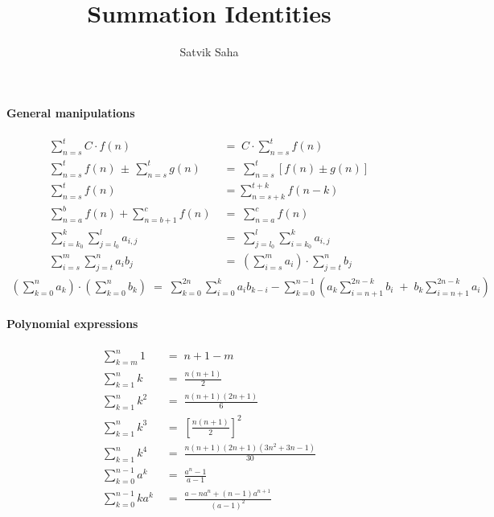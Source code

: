 \documentclass[a4paper, 11pt, reqno]{article}
\title{Summation Identities}
\author{Satvik Saha}
\date{}
\begin{document}
	\maketitle
	
	\paragraph{General manipulations}
	\begin{align*}
		\sum_{n=s}^{t} C\cdot f(n) \; &= \; C\cdot \sum_{n=s}^{t} f(n)	\\
		\sum_{n=s}^{t} f(n) \,\pm\, \sum_{n=s}^{t} g(n) \; &= \;  \sum_{n=s}^{t} \left[ f(n) \pm g(n) \right]	\\
		\sum_{n=s}^{t} f(n) \; &= \!  \sum_{n=s+k}^{t+k} f(n - k)	\\
		\sum_{n=a}^{b} f(n) + \!\!\sum_{n=b+1}^{c} f(n) \; &= \; \sum_{n=a}^{c} f(n)	\\
		\sum_{i=k_0}^{k} \sum_{j=l_0}^{l} a_{i,j} \; &= \; \sum_{j=l_0}^{l} \sum_{i=k_0}^{k} a_{i,j} \\
		\sum_{i=s}^{m} \sum_{j=t}^{n} a_i b_j \; &= \; \left( \sum_{i=s}^{m} a_i \right)\cdot \sum_{j=t}^{n} b_j
	\end{align*}
	\begin{align*}
		\left( \sum_{k=0}^{n} a_k  \right)\cdot \left( \sum_{k=0}^{n} b_k  \right)
			\; = \;  \sum_{k=0}^{2n}\sum_{i=0}^{k}a_i b_{k-i} - \sum_{k=0}^{n-1} \left( a_k \sum_{i=n+1}^{2n-k}b_i  
											\;+\;	    b_k \sum_{i=n+1}^{2n-k}a_i \right)     
	\end{align*}

	\paragraph{Polynomial expressions}
	\begin{align*}
		\sum_{k=m}^{n} 1 	\; &= \;  n + 1 - m	\\
		\sum_{k=1}^{n} k	\; &= \;  \frac{n(n + 1)}{2}	\\
		\sum_{k=1}^{n} k^2	\; &= \;  \frac{n(n + 1)(2n + 1)}{6}	\\
		\sum_{k=1}^{n} k^3	\; &= \;  \left[\frac{n(n + 1)}{2}\right]^2	\\
		\sum_{k=1}^{n} k^4	\; &= \;  \frac{n(n + 1)(2n + 1)(3n^2 + 3n - 1)}{30}	\\
		\sum_{k=0}^{n-1} a^k 	\; &= \;  \frac{a^n - 1}{a - 1}		\\
		\sum_{k=0}^{n-1} ka^k 	\; &= \;  \frac{a - na^n + (n - 1)a^{n+1}}{(a - 1)^2}
	\end{align*}
\end{document}
